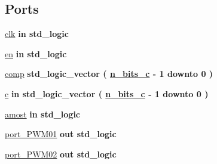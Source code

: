 \subsection*{Ports}
 \begin{DoxyCompactItemize}
\item 
\hyperlink{classfbpspwmdt_a4a4609c199d30b3adebbeb3a01276ec5}{clk}  {\bfseries {\bfseries \textcolor{keywordflow}{in}\textcolor{vhdlchar}{ }}} {\bfseries \textcolor{comment}{std\+\_\+logic}\textcolor{vhdlchar}{ }} 
\item 
\hyperlink{classfbpspwmdt_adcf9c6f5161d039addbda5819bee64a3}{en}  {\bfseries {\bfseries \textcolor{keywordflow}{in}\textcolor{vhdlchar}{ }}} {\bfseries \textcolor{comment}{std\+\_\+logic}\textcolor{vhdlchar}{ }} 
\item 
\hyperlink{classfbpspwmdt_a021a597db1ce780174de5711902bf8f5}{comp}  {\bfseries {\bfseries \textcolor{vhdlchar}{ }}} {\bfseries \textcolor{comment}{std\+\_\+logic\+\_\+vector}\textcolor{vhdlchar}{ }\textcolor{vhdlchar}{(}\textcolor{vhdlchar}{ }\textcolor{vhdlchar}{ }\textcolor{vhdlchar}{ }\textcolor{vhdlchar}{ }{\bfseries \hyperlink{classfbpspwmdt_afee4aa1628956aa350183d8881689198}{n\+\_\+bits\+\_\+c}} \textcolor{vhdlchar}{-\/}\textcolor{vhdlchar}{ } \textcolor{vhdldigit}{1} \textcolor{vhdlchar}{ }\textcolor{keywordflow}{downto}\textcolor{vhdlchar}{ }\textcolor{vhdlchar}{ } \textcolor{vhdldigit}{0} \textcolor{vhdlchar}{ }\textcolor{vhdlchar}{)}\textcolor{vhdlchar}{ }}
\item 
\hyperlink{classfbpspwmdt_a0808bf3e7965a8ee90dec6604647f179}{c}  {\bfseries {\bfseries \textcolor{keywordflow}{in}\textcolor{vhdlchar}{ }}} {\bfseries \textcolor{comment}{std\+\_\+logic\+\_\+vector}\textcolor{vhdlchar}{ }\textcolor{vhdlchar}{(}\textcolor{vhdlchar}{ }\textcolor{vhdlchar}{ }\textcolor{vhdlchar}{ }\textcolor{vhdlchar}{ }{\bfseries \hyperlink{classfbpspwmdt_afee4aa1628956aa350183d8881689198}{n\+\_\+bits\+\_\+c}} \textcolor{vhdlchar}{-\/}\textcolor{vhdlchar}{ } \textcolor{vhdldigit}{1} \textcolor{vhdlchar}{ }\textcolor{keywordflow}{downto}\textcolor{vhdlchar}{ }\textcolor{vhdlchar}{ } \textcolor{vhdldigit}{0} \textcolor{vhdlchar}{ }\textcolor{vhdlchar}{)}\textcolor{vhdlchar}{ }} 
\item 
\hyperlink{classfbpspwmdt_af9b8278b961604ab62a822537a109adb}{amost}  {\bfseries {\bfseries \textcolor{keywordflow}{in}\textcolor{vhdlchar}{ }}} {\bfseries \textcolor{comment}{std\+\_\+logic}\textcolor{vhdlchar}{ }} 
\item 
\hyperlink{classfbpspwmdt_ad6bbafb165991aee14c6014831267789}{port\+\_\+\+P\+W\+M01}  {\bfseries {\bfseries \textcolor{keywordflow}{out}\textcolor{vhdlchar}{ }}} {\bfseries \textcolor{comment}{std\+\_\+logic}\textcolor{vhdlchar}{ }} 
\item 
\hyperlink{classfbpspwmdt_a0b2d13e9c0fd854957d88a65e0905e5b}{port\+\_\+\+P\+W\+M02}  {\bfseries {\bfseries \textcolor{keywordflow}{out}\textcolor{vhdlchar}{ }}} {\bfseries \textcolor{comment}{std\+\_\+logic}\textcolor{vhdlchar}{ }} 
\end{DoxyCompactItemize}


